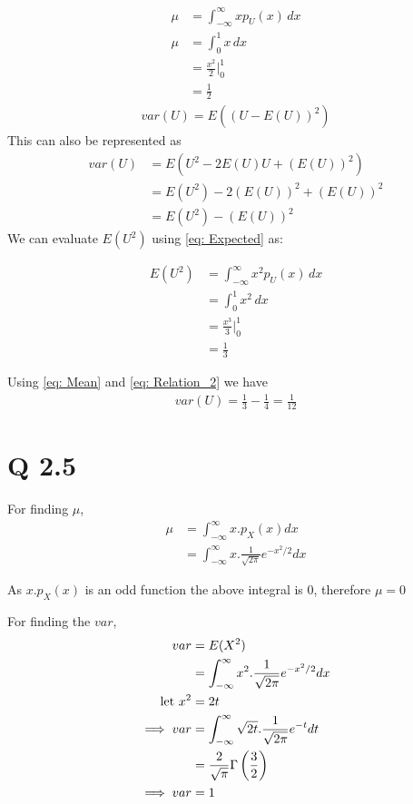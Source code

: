 \documentclass[journal,12pt,twocolumn]{article}
\begin{document}
\begin{align}
    \mu &= \int_{-\infty}^{\infty} x p_U(x) \,dx\label{eq:Relation_1}\\
		\mu &= \int_{0}^{1} x \,dx \\
		&= \frac{x^2}{2} \big|^{1}_{0} \\
		&= \frac{1}{2} 	\label{eq: Mean}
\end{align}
\begin{align}
    var(U) = E((U - E(U))^2)
\end{align}
This can also be represented as
\begin{align}
		var(U) &= E(U^2 - 2E(U)U + (E(U))^2) \\
		&= E(U^2) - 2(E(U))^2 + (E(U))^2 \\
		&= E(U^2) - (E(U))^2
		\label{eq: Relation_2}
\end{align}
We can evaluate $E(U^2)$ using \eqref{eq: Expected} as:
	
\begin{align}
    	E(U^2) &= \int_{-\infty}^{\infty} x^2 p_U(x) \,dx \\
    	&= \int_{0}^{1} x^2 \,dx \\
    	&= \frac{x^3}{3} \big|^{1}_{0} \\
    	&= \frac{1}{3}
\end{align}

    Using \eqref{eq: Mean} and \eqref{eq: Relation_2} we have
\begin{align}
    	var(U) = \frac{1}{3} - \frac{1}{4} = \frac{1}{12}
\end{align}


\section {Q 2.5}
For finding $\mu$,
\begin{align}
    \mu &= \int _ {- \infty} ^ {\infty} {x . p_X(x) dx} \\
    &= \int _ {- \infty} ^ {\infty} {x . \frac{1}{\sqrt{2 \pi}} e^{-x^2 / 2} dx}
\end{align}

As $x . p_X(x)$ is an odd function the above integral is $0$, therefore $\mu = 0$

For finding the $var$,
\begin{align}
    var &= E(X^2) \\
    &= \int _ {- \infty} ^ {\infty} {x^2 . \frac{1}{\sqrt{2 \pi}} e^{-x^2 / 2} dx} \\
    \text{let\,\,} x^2 &= 2t \\
    \implies var &= \int _ {- \infty} ^ {\infty} {\sqrt{2t} . \frac{1}{\sqrt{2\pi}} e^{-t} dt} \\
    &= \frac{2}{\sqrt{\pi}} \Gamma \left(\frac{3}{2}\right) \\
    \implies var &= 1
\end{align}
\end{document}
